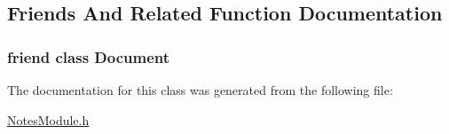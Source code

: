 \subsection{Friends And Related Function Documentation}
\hypertarget{class_notes_module_1_1_document_1_1_iterator_a883538034e58fc5c0de7d4e4cab3cef7}{
\subsubsection[{Document}]{\setlength{\rightskip}{0pt plus 5cm}friend class {\bf Document}\hspace{0.3cm}{\ttfamily [friend]}}}\label{class_notes_module_1_1_document_1_1_iterator_a883538034e58fc5c0de7d4e4cab3cef7}


The documentation for this class was generated from the following file\-:\begin{DoxyCompactItemize}
\item 
\hyperlink{_notes_module_8h}{Notes\-Module.\-h}\end{DoxyCompactItemize}
